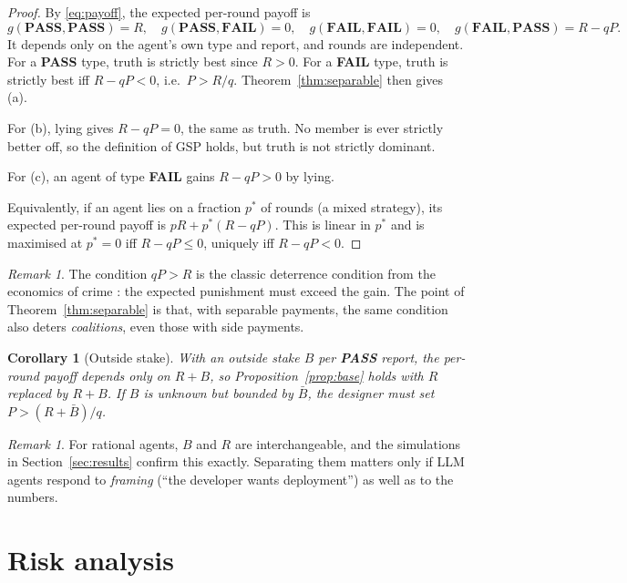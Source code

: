 \documentclass[11pt]{article}
\newtheorem{corollary}[theorem]{Corollary}
\theoremstyle{definition}
\theoremstyle{remark}
\newtheorem{remark}[theorem]{Remark}
\newcommand{\PASS}{\textbf{PASS}}
\newcommand{\FAIL}{\textbf{FAIL}}
\newcommand{\1}{\mathbf{1}}
\begin{document}
\begin{proof}
By \eqref{eq:payoff}, the expected per-round payoff is
\[
g(\PASS,\PASS)=R,\quad g(\PASS,\FAIL)=0,\quad g(\FAIL,\FAIL)=0,\quad
g(\FAIL,\PASS)=R-qP.
\]
It depends only on the agent's own type and report, and rounds are independent. For a
\PASS{} type, truth is strictly best since $R>0$. For a \FAIL{} type, truth is strictly
best iff $R-qP<0$, i.e.\ $P>R/q$. Theorem~\ref{thm:separable} then gives (a).

For (b), lying gives $R-qP=0$, the same as truth. No member is ever strictly better
off, so the definition of GSP holds, but truth is not strictly dominant.

For (c), an agent of type \FAIL{} gains $R-qP>0$ by lying.

Equivalently, if an agent lies on a fraction $p^\ast$ of rounds (a mixed strategy), its
expected per-round payoff is $pR+p^\ast(R-qP)$. This is linear in $p^\ast$ and is
maximised at $p^\ast=0$ iff $R-qP\le 0$, uniquely iff $R-qP<0$.
\end{proof}

\begin{remark}
The condition $qP>R$ is the classic deterrence condition from the economics of crime
\cite{becker1968}: the expected punishment must exceed the gain. The point of
Theorem~\ref{thm:separable} is that, with separable payments, the same condition also
deters \emph{coalitions}, even those with side payments.
\end{remark}

\begin{corollary}[Outside stake]\label{cor:stake}
With an outside stake $B$ per \PASS{} report, the per-round payoff depends only on $R+B$,
so Proposition~\ref{prop:base} holds with $R$ replaced by $R+B$. If $B$ is unknown but
bounded by $\bar B$, the designer must set $P>(R+\bar B)/q$.
\end{corollary}

\begin{remark}
For rational agents, $B$ and $R$ are interchangeable, and the simulations in
Section~\ref{sec:results} confirm this exactly. Separating them matters only if LLM agents
respond to \emph{framing} (``the developer wants deployment'') as well as to the numbers.
\end{remark}

\section{Risk analysis}
\label{sec:risk}
\end{document}

